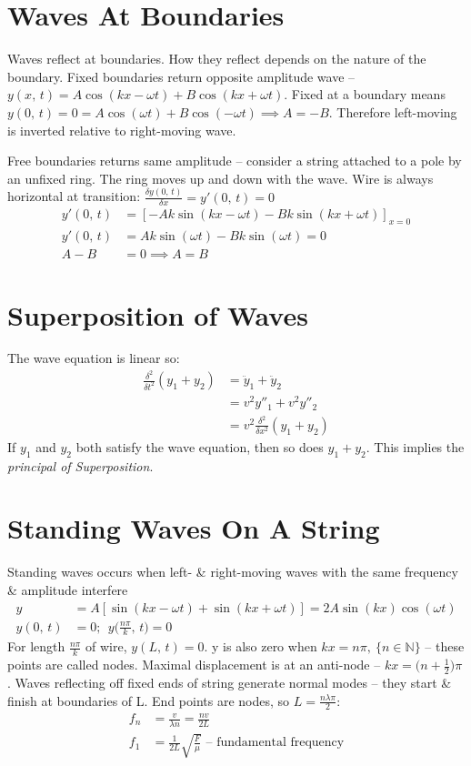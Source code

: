 \documentclass[a4paper, 11pt, normalem]{report}
\begin{document}
\section{Waves At Boundaries}
Waves reflect at boundaries.
How they reflect depends on the nature of the boundary.
Fixed boundaries return opposite amplitude wave -- $y(x,\,t) = A\cos{(kx - \omega t)} + B\cos{(kx + \omega t)}$.
Fixed at a boundary means $y(0,\,t) = 0 = A\cos{(\omega t)} + B\cos{(-\omega t)} \implies A = -B$.
Therefore left-moving is inverted relative to right-moving wave.

Free boundaries returns same amplitude -- consider a string attached to a pole by an unfixed ring.
The ring moves up and down with the wave. 
Wire is always horizontal at transition: $\frac{\delta y(0,\,t)}{\delta x} = y'(0,\,t) = 0$
\begin{align}
    y'(0,\,t) &= [-Ak\sin{(kx - \omega t)} - Bk\sin{(kx + \omega t)}]_{x = 0} \\
    y'(0,\,t) &= Ak\sin{(\omega t)} - Bk\sin{(\omega t)} = 0 \\
    A - B &= 0 \implies A = B
\end{align}

\section{Superposition of Waves}
The wave equation is linear so:
\begin{align}
    \frac{\delta^{2}}{\delta t^{2}}(y_{1} + y_{2}) &= \ddot{y}_{1} + \ddot{y}_{2} \\
                                                   &= v^{2}y''_{1} + v^{2}y''_{2} \\
                                                   &= v^{2}\frac{\delta^{2}}{\delta x^{2}}(y_{1} + y_{2})
\end{align}
If $y_{1}$ and $y_{2}$ both satisfy the wave equation, then so does $y_{1} + y_{2}$.
This implies the \emph{principal of Superposition}.

\section{Standing Waves On A String}
Standing waves occurs when left- \& right-moving waves with the same frequency \& amplitude interfere
\begin{align}
    y &= A[\sin{(kx - \omega t)} + \sin{(kx + \omega t)}] = 2A\sin{(kx)}\cos{(\omega t)} \\
    y(0,\,t) &= 0;\;\,y\Big(\frac{n\pi}{k},\,t\Big) = 0
\end{align}
For length $\frac{n\pi}{k}$ of wire, $y(L,\,t) = 0$.
y is also zero when $kx = n\pi,~\{ n \in \mathbb{N}\}$ -- these points are called nodes.
Maximal displacement is at an anti-node -- $kx = \Big(n + \frac{1}{2}\Big)\pi$.
Waves reflecting off fixed ends of string generate normal modes -- they start \& finish at boundaries of L.
End points are nodes, so $L = \frac{n\lambda\pi}{2}$:
\begin{align}
    f_{n} &= \frac{v}{\lambda n} = \frac{nv}{2L} \\
    f_{1} &= \frac{1}{2L}\sqrt{\frac{F}{\mu}}\text{ -- fundamental frequency}
\end{align}
\end{document}
